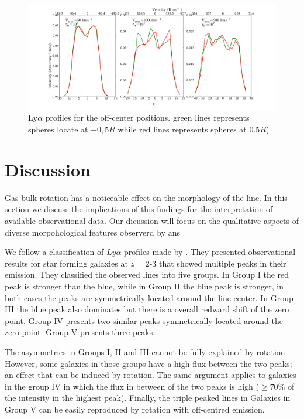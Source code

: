 \documentclass{emulateapj}
\newcommand{\ly}{{\ifmmode{{\rm Ly}\alpha~}\else{Ly$\alpha$~}\fi}}
\begin{document}
\begin{figure}
\includegraphics[scale=0.3]{NewPanel_N6_atpm5.png}
\caption{$\mathrm{Ly}\alpha$ profiles for the off-center positions.
green lines represents spheres locate at $-0,5R$ while red lines 
represents spheres at $0.5R$)
   \label{fig:OC_profiles_N6}} 
\end{figure}


\section{Discussion}
\label{sec:discussion}

Gas bulk rotation has a noticeable effect on the morphology of the
 \ly line. In this section we discuss the implications of this
 findings for the interpretation of available observational data. Our
 dicussion will focus on the qualitative aspects of diverse
 morpohological features observerd by \cite{Kulas12} ans \cite{Yamada2012}


We follow a classification of $Ly\alpha$ profiles made by
\cite{Kulas12}. They presented observational results for star forming
galaxies at $z=2$-$3$ that showed multiple peaks in their emission.
They classified the observed lines into five groups. In Group I the
red peak is stronger than the blue, while in Group II the blue peak is
stronger, in both cases the peaks are symmetrically located around the
line center. In Group III the blue peak also dominates but there is a
overall redward shift of the zero point. Group IV presents two similar
peaks symmetrically located around the zero point. Group V presents
three peaks. 


The asymmetries in Groups I, II  and III cannot be fully explained by
rotation. However, some galaxies in those groups have a high flux between
the two peaks; an effect that can be induced by rotation. The same
argument applies to galaxies in the group IV in which the flux
in between of the two peaks is high ($ \geq 70 \%$ of the intensity in
the highest peak). Finally, the triple peaked lines in Galaxies in
Group V can be easily reproduced by rotation with off-centred
emission. 
\end{document}
